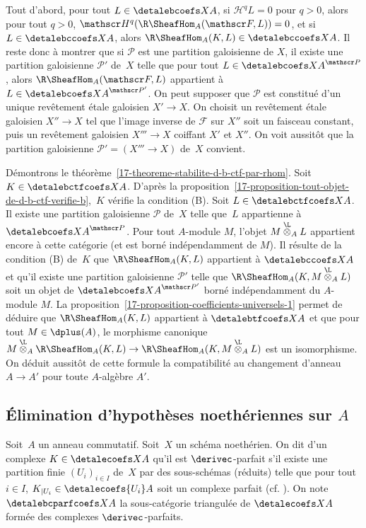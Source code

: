 \documentclass[10pt]{../fichiers-configuration-latex/smfart}
\begin{document}
Tout d'abord, pour tout $L\in\detalebcoefs X A$, si
$\mathscr H^qL=0$ pour $q>0$, alors pour tout $q>0$, $\mathscr
H^q(\R\SheafHom_A(\mathscr F,L))=0$, et si $L\in\detalebccoefs X A$, alors
$\R\SheafHom_A(K,L)\in\detalebccoefs X A$.
Il reste donc à montrer que si $\mathscr P$ est une partition galoisienne
de $X$, il existe une partition galoisienne $\mathscr P'$ de $X$ telle que
pour tout $L\in{\detalebcoefs X A}^{\mathscr P}$, alors
$\R\SheafHom_A(\mathscr F,L)$ appartient à
$L\in{\detalebcoefs X A}^{\mathscr P'}$. On peut supposer que $\mathscr P$ est
constitué d'un unique revêtement étale galoisien $X'\to X$. On choisit
un revêtement étale galoisien $X''\to X$ tel que l'image inverse de
$\mathscr F$ sur $X''$ soit un faisceau constant, puis un
revêtement galoisien $X'''\to X$ coiffant $X'$ et $X''$. On voit aussitôt
que la partition galoisienne $\mathscr P'=(X'''\to X)$ de $X$ convient.

\bigskip

Démontrons le théorème~\ref{17-theoreme-stabilite-d-b-ctf-par-rhom}. Soit
$K\in\detalebctfcoefs X A$. D'après la
proposition~\ref{17-proposition-tout-objet-de-d-b-ctf-verifie-b}, $K$ vérifie
la condition (B). Soit $L\in\detalebctfcoefs X A$. Il existe une partition
galoisienne $\mathscr P$ de $X$ telle que $L$ appartienne à 
${\detalebcoefs X A}^{\mathscr P}$. Pour tout $A$-module $M$, l'objet
$M\overset{\L}\otimes_A L$ appartient encore à cette catégorie (et
est borné indépendamment de $M$). Il résulte de la condition (B) de $K$ que
$\R\SheafHom_A(K,L)$ appartient à $\detalebccoefs X A$ et qu'il
existe une partition galoisienne $\mathscr P'$ telle que
$\R\SheafHom_A(K,M\overset{\L}\otimes_A L)$ soit un objet de
${\detalebcoefs X A}^{\mathscr P'}$ borné indépendamment du $A$-module $M$.
La proposition~\ref{17-proposition-coefficients-universels-1} permet de
déduire que $\R\SheafHom_A(K,L)$ appartient à $\detalebtfcoefs X A$ et
que pour tout $M\in\dplus(A)$, le morphisme canonique
$M\overset{\L}{\otimes}_A \R\SheafHom_A(K,L)\to
\R\SheafHom_A(K,M\overset{\L}{\otimes}_A L)$ est un
isomorphisme. On déduit aussitôt de cette formule la compatibilité au
changement d'anneau $A\to A'$ pour toute $A$-algèbre $A'$.

\subsection{Élimination d'hypothèses noethériennes sur \texorpdfstring{$A$}{A}}%

\begin{definition2}\label{17-definition-c-perfection}
Soit $A$ un anneau commutatif.
Soit $X$ un schéma noethérien. On dit d'un complexe
$K\in \detalecoefs X A$ qu'il est $\derivec$-parfait s'il existe une partition
finie $(U_i)_{i\in I}$ de $X$ par des sous-schémas (réduits) telle que pour
tout $i\in I$, $K_{|U_i}\in \detalecoefs {U_i} A$ soit un complexe parfait (cf.
). On note $\detalebcparfcoefs X A$ la sous-catégorie triangulée de
$\detalecoefs X A$ formée des complexes $\derivec$-parfaits.
\end{definition2}
\end{document}
